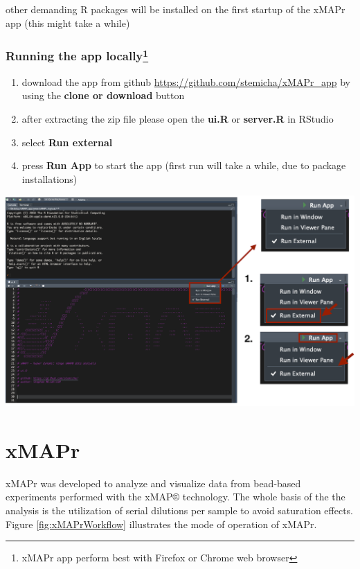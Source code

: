 \documentclass[
]{book}
\providecommand{\tightlist}{%
  \setlength{\itemsep}{0pt}\setlength{\parskip}{0pt}}
\begin{document}
other demanding R packages will be installed on the first startup of the xMAPr app (this might take a while)

\hypertarget{running-the-app-locally}{%
\subsection[Running the app locally]{\texorpdfstring{Running the app locally\footnote{xMAPr app perform best with Firefox or Chrome web browser}}{Running the app locally}}\label{running-the-app-locally}}

\begin{enumerate}
\def\labelenumi{\arabic{enumi}.}
\tightlist
\item
  download the app from github \url{https://github.com/stemicha/xMAPr_app} by using the \textbf{clone or download} button
\item
  after extracting the zip file please open the \textbf{ui.R} or \textbf{server.R} in RStudio
\item
  select \textbf{Run external}
\item
  press \textbf{Run App} to start the app (first run will take a while, due to package installations)
\end{enumerate}

\begin{center}\includegraphics[width=27.78in]{figures/run_app_locally} \end{center}

\hypertarget{xmapr}{%
\chapter{xMAPr}\label{xmapr}}

xMAPr was developed to analyze and visualize data from bead-based experiments performed with the xMAP® technology. The whole basis of the the analysis is the utilization of serial dilutions per sample to avoid saturation effects. Figure \ref{fig:xMAPrWorkflow} illustrates the mode of operation of xMAPr.
\end{document}
